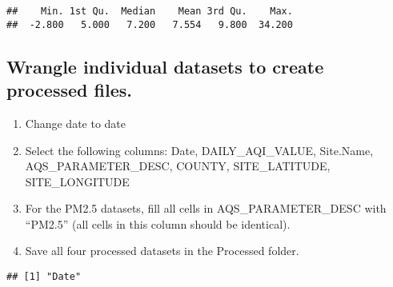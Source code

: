 \documentclass[]{article}
\newenvironment{Shaded}{\begin{snugshade}}{\end{snugshade}}
\newcommand{\KeywordTok}[1]{\textcolor[rgb]{0.13,0.29,0.53}{\textbf{#1}}}
\newcommand{\DataTypeTok}[1]{\textcolor[rgb]{0.13,0.29,0.53}{#1}}
\newcommand{\FloatTok}[1]{\textcolor[rgb]{0.00,0.00,0.81}{#1}}
\newcommand{\StringTok}[1]{\textcolor[rgb]{0.31,0.60,0.02}{#1}}
\newcommand{\CommentTok}[1]{\textcolor[rgb]{0.56,0.35,0.01}{\textit{#1}}}
\newcommand{\OperatorTok}[1]{\textcolor[rgb]{0.81,0.36,0.00}{\textbf{#1}}}
\newcommand{\NormalTok}[1]{#1}
\providecommand{\tightlist}{%
  \setlength{\itemsep}{0pt}\setlength{\parskip}{0pt}}
\begin{document}
\begin{verbatim}
##    Min. 1st Qu.  Median    Mean 3rd Qu.    Max. 
##  -2.800   5.000   7.200   7.554   9.800  34.200
\end{verbatim}

\subsection{Wrangle individual datasets to create processed
files.}\label{wrangle-individual-datasets-to-create-processed-files.}

\begin{enumerate}
\def\labelenumi{\arabic{enumi}.}
\setcounter{enumi}{2}
\tightlist
\item
  Change date to date
\item
  Select the following columns: Date, DAILY\_AQI\_VALUE, Site.Name,
  AQS\_PARAMETER\_DESC, COUNTY, SITE\_LATITUDE, SITE\_LONGITUDE
\item
  For the PM2.5 datasets, fill all cells in AQS\_PARAMETER\_DESC with
  ``PM2.5'' (all cells in this column should be identical).
\item
  Save all four processed datasets in the Processed folder.
\end{enumerate}

\begin{Shaded}
\end{Shaded}

\begin{verbatim}
## [1] "Date"
\end{verbatim}

\begin{Shaded}
\end{Shaded}
\end{document}
